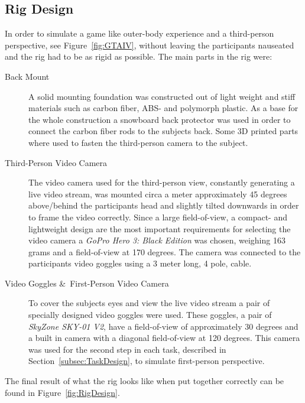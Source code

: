 \documentclass[runningheads,a4paper,oribibl]{llncs}
\begin{document}
\subsection{Rig Design}
In order to simulate a game like outer-body experience and a third-person perspective, see Figure~\ref{fig:GTAIV}, without leaving the participants nauseated and the rig had to be as rigid as possible. The main parts in the rig were:
\begin{description}

	\item[Back Mount] A solid mounting foundation was constructed out of light weight and stiff materials such as carbon fiber, ABS- and polymorph plastic. As a base for the whole construction a snowboard back protector was used in order to connect the carbon fiber rods to the subjects back. Some 3D printed parts where used to fasten the third-person camera to the subject.

	\item[Third-Person Video Camera] The video camera used for the third-person view, constantly generating a live video stream, was mounted circa a meter approximately 45 degrees above/behind the participants head and slightly tilted downwards in order to frame the video correctly. Since a large field-of-view, a compact- and lightweight design are the most important requirements for selecting the video camera a \emph{GoPro Hero 3: Black Edition} was chosen, weighing 163 grams and a field-of-view at 170 degrees. The camera was connected to the participants video goggles using a 3 meter long, 4 pole, cable.

	\item[Video Goggles \&\ First-Person Video Camera] To cover the subjects eyes and view the live video stream a pair of specially designed video goggles were used. These goggles, a pair of \emph{SkyZone SKY-01 V2}, have a field-of-view of approximately 30 degrees and a built in camera with a diagonal field-of-view at 120 degrees. This camera was used for the second step in each task, described in Section~\ref{subsec:TaskDesign}, to simulate first-person perspective.
\end{description}
The final result of what the rig looks like when put together correctly can be found in Figure~\ref{fig:RigDesign}.
\end{document}
